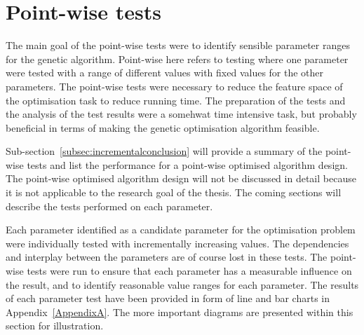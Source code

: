 

\section{Point-wise tests}

The main goal of the point-wise tests were to identify sensible parameter ranges for the genetic algorithm. Point-wise here refers to testing where one parameter were tested with a range of different values with fixed values for the other parameters. The point-wise tests were necessary to reduce the feature space of the optimisation task to reduce running time. The preparation of the tests and the analysis of the test results were a somehwat time intensive task, but probably beneficial in terms of making the genetic optimisation algorithm feasible.

Sub-section~\ref{subsec:incrementalconclusion} will provide a summary of the point-wise tests and list the performance for a point-wise optimised algorithm design. The point-wise optimised algorithm design will not be discussed in detail because it is not applicable to the research goal of the thesis. The coming sections will describe the tests performed on each parameter.

Each parameter identified as a candidate parameter for the optimisation problem were individually tested with incrementally increasing values. The dependencies and interplay between the parameters are of course lost in these tests. The point-wise tests were run to ensure that each parameter has a measurable influence on the result, and to identify reasonable value ranges for each parameter. The results of each parameter test have been provided in form of line and bar charts in Appendix~\ref{AppendixA}. The more important diagrams are presented within this section for illustration.

